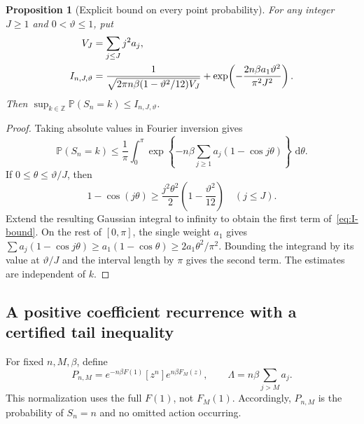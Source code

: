 \documentclass[11pt,a4paper]{article}
\numberwithin{equation}{section}
\newtheorem{proposition}[theorem]{Proposition}
\theoremstyle{definition}
\theoremstyle{remark}
\newcommand{\Prob}{\mathbb P}
\newcommand{\dd}{\,\mathrm d}
\begin{document}
\begin{proposition}[Explicit bound on every point probability]
\label{prop:anti-concentration}
For any integer \(J\ge1\) and \(0<\vartheta\le1\), put
\begin{align}
 V_J&=\sum_{j\le J}j^2a_j,\notag\\
 I_{n,J,\vartheta}
 &=\frac{1}{\sqrt{2\pi n\beta(1-\vartheta^2/12)V_J}}
 +\exp\!\left(-\frac{2n\beta a_1\vartheta^2}{\pi^2J^2}\right).
 \label{eq:I-bound}
\end{align}
Then \(\sup_{k\in\mathbb Z}\Prob(S_n=k)\le I_{n,J,\vartheta}\).
\end{proposition}
\begin{proof}
Taking absolute values in Fourier inversion gives
\[
 \Prob(S_n=k)\le\frac1\pi\int_0^\pi
 \exp\left\{-n\beta\sum_{j\ge1}a_j(1-\cos j\theta)\right\}\,\dd\theta.
\]
If \(0\le\theta\le\vartheta/J\), then
\[
 1-\cos(j\theta)\ge\frac{j^2\theta^2}{2}
 \left(1-\frac{\vartheta^2}{12}\right)\quad(j\le J).
\]
Extend the resulting Gaussian integral to infinity to obtain the first
term of~\eqref{eq:I-bound}. On the rest of \([0,\pi]\), the single weight
\(a_1\) gives
\(\sum a_j(1-\cos j\theta)\ge a_1(1-\cos\theta)
\ge2a_1\theta^2/\pi^2\).
Bounding the integrand by its value at \(\vartheta/J\) and the interval
length by \(\pi\) gives the second term. The estimates are independent of
\(k\).
\end{proof}

\subsection{A positive coefficient recurrence with a certified tail inequality}
For fixed \(n,M,\beta\), define
\begin{equation}
 P_{n,M}=e^{-n\beta F(1)}[z^n]e^{n\beta F_M(z)},\qquad
 \Lambda=n\beta\sum_{j>M}a_j.
 \label{eq:P-certificate}
\end{equation}
This normalization uses the full \(F(1)\), not \(F_M(1)\). Accordingly,
\(P_{n,M}\) is the probability of \(S_n=n\) and no omitted action occurring.
\end{document}
